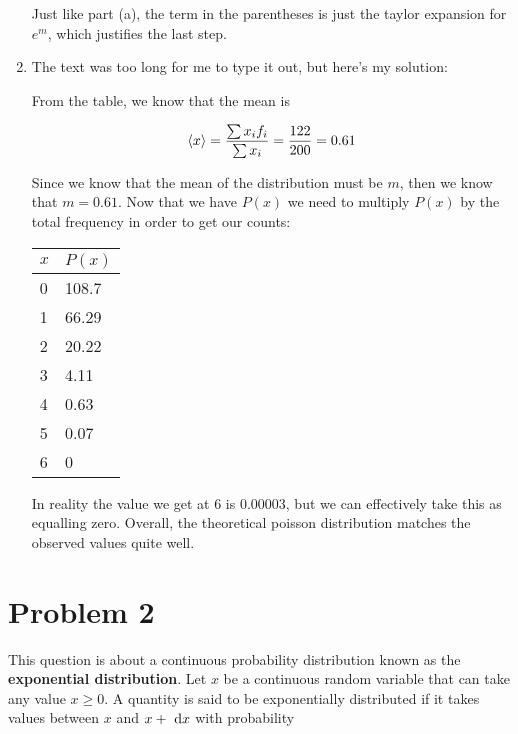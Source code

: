 \documentclass{article}
\begin{document}
\begin{enumerate}[label=(\alph*)]
\begin{solution}
        Just like part (a), the term in the parentheses is just the taylor expansion for $e^{m}$, which justifies the last step.
    \end{solution}


    \item The text was too long for me to type it out, but here's my solution:
    
    \begin{solution}
        From the table, we know that the mean is 
        
        
        \[\langle x \rangle = \frac{\sum x_if_i}{\sum x_i} = \frac{122}{200} = 0.61\]
        
        
        Since we know that the mean of the distribution must be $m$, then we know that $m = 0.61$. Now that we have $P(x)$ we need to multiply $P(x)$ by the total frequency in order to get our counts:
        
        \begin{center}
            \begin{tabular}{|l|l|}
            \hline
            $x$ & $P(x)$ \\ \hline
            0   & 108.7  \\ \hline
            1   & 66.29  \\ \hline
            2   & 20.22  \\ \hline
            3   & 4.11  \\ \hline
            4   & 0.63  \\ \hline
            5   & 0.07   \\ \hline
            6   & 0
            \end{tabular}
        \end{center}
        In reality the value we get at 6 is 0.00003, but we can effectively take this as equalling zero. Overall, the theoretical poisson distribution matches the observed values quite well.
    \end{solution}

\end{enumerate}

\pagebreak
\section*{Problem 2}

This question is about a continuous probability distribution known as the \textbf{exponential distribution}. Let $x$ be a continuous random variable that can take any value $x \ge 0$. A quantity is said to be exponentially distributed if it takes values between $x$ and $x +\ \mathrm d x$ with probability 
\end{document}
